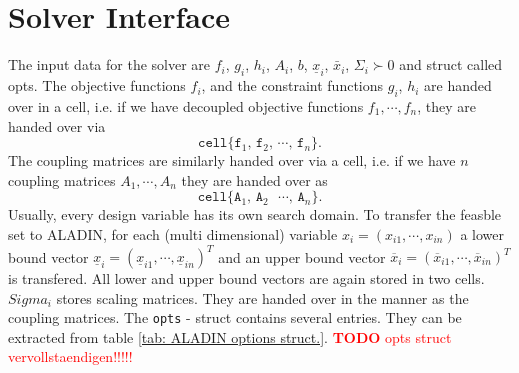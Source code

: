 \documentclass[]{scrartcl}
\begin{document}
\section{Solver Interface}
The input data for the solver are $f_i$, $g_i$, $h_i$, $A_i$, $b$, $\underline{x}_i$, $\bar x_i$, $\Sigma_i \succ 0$ and struct called opts. The objective functions $f_i$, and the constraint functions $g_i$, $h_i$ are handed over in a cell, i.e. if we have decoupled objective functions $f_1, \cdots , f_n$, they are handed over via $$
\texttt{cell\{f$_1$, f$_2$, $\cdots$, f$_n$\}}.$$
 The coupling matrices are similarly handed over via a cell, i.e. if we have $n$ coupling matrices $A_1, \cdots , A_n$ they are handed over as 
 $$\texttt{cell\{A$_1$, A$_2$ $\cdots$, A$_n$\}}.$$ Usually, every design variable has its own search domain. To transfer the feasble set to ALADIN, for each (multi dimensional) variable $x_i = (x_{i1}, \cdots , x_{in})$ a lower bound vector $\underline{x}_i = (\underline{x}_{i1}, \cdots , \underline{x}_{in})^T$ and an upper bound vector $\overline{x}_i = (\overline{x}_{i1}, \cdots , \overline{x}_{in})^T$ is transfered. All lower and upper bound vectors are again stored in two cells. $Sigma_i$ stores scaling matrices. They are handed over in the manner as the coupling matrices. The \texttt{opts} - struct contains several entries. They can be extracted from table \ref{tab: ALADIN options struct.}. \textcolor{red}{\textbf{TODO} opts struct vervollstaendigen!!!!!} 
\end{document}
